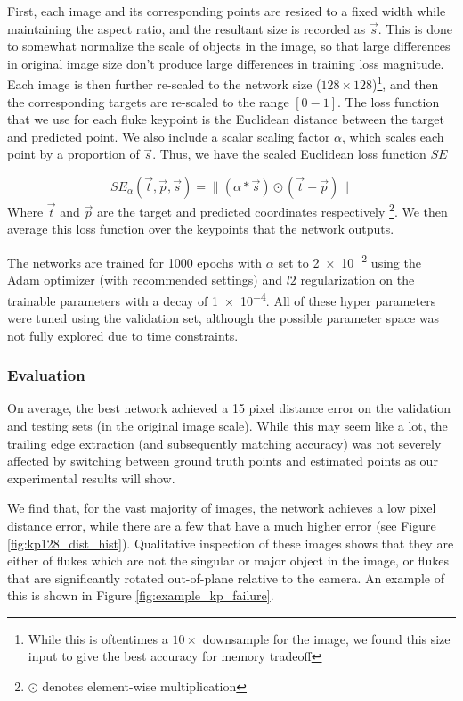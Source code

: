 First, each image and its corresponding points are resized to a fixed width while maintaining the aspect ratio, and the resultant size is recorded as $\vec{s}$.
This is done to somewhat normalize the scale of objects in the image, so that large differences in original image size don't produce large differences in training loss magnitude.
Each image is then further re-scaled to the network size ($128 \times 128$)\footnote{While this is oftentimes a $10\times$ downsample for the image, we found this size input to give the best accuracy for memory tradeoff}, and then the corresponding targets are re-scaled to the range $[0-1]$.
The loss function that we use for each fluke keypoint is the Euclidean distance between the target and predicted point.
We also include a scalar scaling factor $\alpha$, which scales each point by a proportion of $\vec{s}$.
Thus, we have the scaled Euclidean loss function $SE$

\begin{equation} \label{eqn:se_loss}
SE_{\alpha}(\vec{t}, \vec{p}, \vec{s}) = \lVert (\alpha * \vec{s}) \odot (\vec{t} - \vec{p}) \rVert
\end{equation} 
Where $\vec{t}$ and $\vec{p}$ are the target and predicted coordinates respectively \footnote{$\odot$ denotes element-wise multiplication}.
We then average this loss function over the keypoints that the network outputs.

The networks are trained for 1000 epochs with $\alpha$ set to \num{2e-2} using the Adam \cite{kingma2014adam} optimizer (with recommended settings) and $l2$ regularization on the trainable parameters with a decay of \num{1e-4}.
All of these hyper parameters were tuned using the validation set, although the possible parameter space was not fully explored due to time constraints.

\subsubsection{Evaluation} 

On average, the best network achieved a 15 pixel distance error on the validation and testing sets (in the original image scale).
While this may seem like a lot, the trailing edge extraction (and subsequently matching accuracy) was not severely affected by switching between ground truth points and estimated points as our experimental results will show. 

We find that, for the vast majority of images, the network achieves a low pixel distance error, while there are a few that have a much higher error (see Figure \ref{fig:kp128_dist_hist}).
Qualitative inspection of these images shows that they are either of flukes which are not the singular or major object in the image, or flukes that are significantly rotated out-of-plane relative to the camera.
An example of this is shown in Figure \ref{fig:example_kp_failure}.

